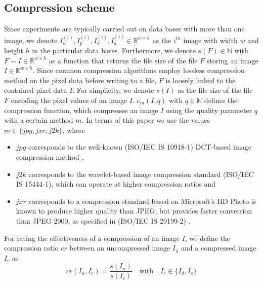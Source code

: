 \documentclass[10pt,twocolumn,letterpaper]{article}
\begin{document}
\subsection{Compression scheme}
 Since experiments are typically carried out on data bases with more than one image, we denote $I_u^{(i)}, I_p^{(i)}, I_s^{(i)}, I_d^{(i)} \in \mathbb{R}^{w \times h}$ as the $i^{th}$ image with width $w$ and height $h$ in the particular data bases. Furthermore, we denote $s(F) \in \mathbb{N}$ with $F \sim{I \in \mathbb{R}^{w \times h}}$ as a function that returns the file size of the file $F$ storing an image $I \in \mathbb{R}^{w \times h} $. Since common compression algorithms employ lossless compression method on the pixel data before writing to a file, $F$ is loosely linked to the contained pixel data $I$. For simplicity, we denote $s(I)$ as the file size of the file $F$ encoding the pixel values of an image $I$. $c_{m}(I, q)$ with $q \in \mathbb{N}$ defines the compression function, which compresses an image $I$ using the quality parameter $q$ with a certain method $m$. In terms of this paper we use the values $m \in \{jpg, jxr, j2k\}$, where 
\begin{itemize}
	\item $jpg$ corresponds to the well-known (ISO/IEC IS 10918-1) DCT-based image compression method \cite{jpg},
	\item $j2k$ corresponds to the wavelet-based image compression standard (ISO/IEC IS 15444-1), which can operate at higher compression ratios \cite{j2k} and
	\item $jxr$ corresponds to a compression standard based on Microsoft’s HD Photo is known to produce higher quality than JPEG, but provides faster conversion than JPEG 2000, as specified in (ISO/IEC IS 29199-2) \cite{jxr}.  
\end{itemize}


For rating the effectiveness of a compression of an image $I$, we define the compression ratio $cr$ between an uncompressed image $I_u$ and a compressed image $I_c$ as 
\begin{equation}
cr(I_u, I_c) = \frac{s(I_u)}{s(I_c)} \quad \text{with} \quad I_c \in \{I_d, I_s\}
\end{equation}
\end{document}
